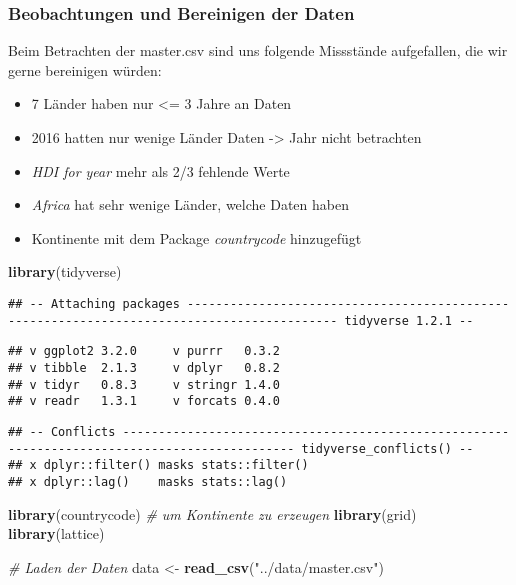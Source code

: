 \documentclass[]{article}
\newenvironment{Shaded}{\begin{snugshade}}{\end{snugshade}}
\newcommand{\CommentTok}[1]{\textcolor[rgb]{0.56,0.35,0.01}{\textit{#1}}}
\newcommand{\KeywordTok}[1]{\textcolor[rgb]{0.13,0.29,0.53}{\textbf{#1}}}
\newcommand{\NormalTok}[1]{#1}
\newcommand{\StringTok}[1]{\textcolor[rgb]{0.31,0.60,0.02}{#1}}
\providecommand{\tightlist}{%
  \setlength{\itemsep}{0pt}\setlength{\parskip}{0pt}}
\begin{document}
\hypertarget{beobachtungen-und-bereinigen-der-daten}{%
\subsubsection{Beobachtungen und Bereinigen der
Daten}\label{beobachtungen-und-bereinigen-der-daten}}

Beim Betrachten der master.csv sind uns folgende Missstände aufgefallen,
die wir gerne bereinigen würden:

\begin{itemize}
\tightlist
\item
  7 Länder haben nur \textless= 3 Jahre an Daten
\item
  2016 hatten nur wenige Länder Daten -\textgreater{} Jahr nicht
  betrachten
\item
  \emph{HDI for year} mehr als 2/3 fehlende Werte
\item
  \emph{Africa} hat sehr wenige Länder, welche Daten haben
\item
  Kontinente mit dem Package \emph{countrycode} hinzugefügt
\end{itemize}

\begin{Shaded}
\begin{Highlighting}[]
\KeywordTok{library}\NormalTok{(tidyverse)}
\end{Highlighting}
\end{Shaded}

\begin{verbatim}
## -- Attaching packages ------------------------------------------------------------------------------------------- tidyverse 1.2.1 --
\end{verbatim}

\begin{verbatim}
## v ggplot2 3.2.0     v purrr   0.3.2
## v tibble  2.1.3     v dplyr   0.8.2
## v tidyr   0.8.3     v stringr 1.4.0
## v readr   1.3.1     v forcats 0.4.0
\end{verbatim}

\begin{verbatim}
## -- Conflicts ---------------------------------------------------------------------------------------------- tidyverse_conflicts() --
## x dplyr::filter() masks stats::filter()
## x dplyr::lag()    masks stats::lag()
\end{verbatim}

\begin{Shaded}
\begin{Highlighting}[]
\KeywordTok{library}\NormalTok{(countrycode)   }\CommentTok{# um Kontinente zu erzeugen}
\KeywordTok{library}\NormalTok{(grid)}
\KeywordTok{library}\NormalTok{(lattice)}


\CommentTok{# Laden der Daten}
\NormalTok{data <-}\StringTok{ }\KeywordTok{read_csv}\NormalTok{(}\StringTok{"../data/master.csv"}\NormalTok{)}
\end{Highlighting}
\end{Shaded}
\end{document}
